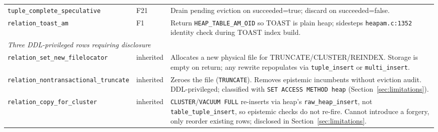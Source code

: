 \begin{table}[t]
\begin{tabular}{p{2.6cm}p{1.1cm}p{3.5cm}}
\texttt{tuple\_complete\_speculative}& F21 & Drain pending eviction on succeeded=true; discard on succeeded=false. \\
\texttt{relation\_toast\_am}         & F1  & Return \texttt{HEAP\_TABLE\_AM\_OID} so TOAST is plain heap; sidesteps \texttt{heapam.c:1352} identity check during TOAST index build. \\
\midrule
\multicolumn{3}{l}{\emph{Three DDL-privileged rows requiring disclosure}} \\
\midrule
\texttt{relation\_set\_new\_filelocator} & inherited & Allocates a new physical file for TRUNCATE/CLUSTER/REINDEX. Storage is empty on return; any rewrite repopulates via \texttt{tuple\_insert} or \texttt{multi\_insert}. \\
\texttt{relation\_nontransactional\_truncate} & inherited & Zeroes the file (\texttt{TRUNCATE}). Removes epistemic incumbents without eviction audit. DDL-privileged; classified with \texttt{SET ACCESS METHOD heap} (Section~\ref{sec:limitations}). \\
\texttt{relation\_copy\_for\_cluster} & inherited & \texttt{CLUSTER}/\texttt{VACUUM FULL} re-inserts via heap's \texttt{raw\_heap\_insert}, not \texttt{table\_tuple\_insert}, so epistemic checks do not re-fire. Cannot introduce a forgery, only reorder existing rows; disclosed in Section~\ref{sec:limitations}. \\
\bottomrule
\end{tabular}
\end{table}

